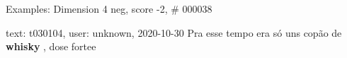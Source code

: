 \begin{frame}{Examples: Dimension 4 neg, score -2, \# 000038}
\footnotesize
\begin{alertblock}{text: t030104, user: unknown, 2020-10-30}
Pra esse tempo era só uns copão de \textbf{whisky} , dose fortee 
 \textbf{} 
\end{alertblock}
\end{frame}
